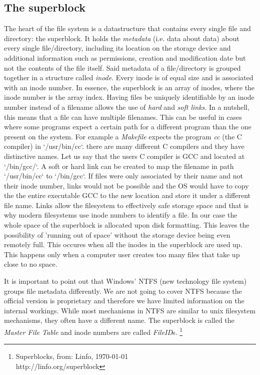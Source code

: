 \begin{enumerate}
\subsection{The superblock}

The heart of the file system is a datastructure that contains every single file and directory: the
superblock. It holds the \textit{metadata} (i.e. data about data) about every single file/directory,
including its location on the storage device and additional information such as permissions, creation
and modification date but not the contents of the file itself. Said metadata of a file/directory is
grouped together in a structure called \textit{inode}. Every inode is of equal size and is associated
with an inode number. In essence, the superblock is an array of inodes, where the inode number is the
array index. Having files be uniquely identifiable by an inode number instead of a filename allows 
the use of \textit{hard} and \textit{soft links}. In a nutshell, this means that a file can have multiple filenames.
This can be useful in cases where some programs expect a certain path for a different program than the
one present on the system. For example a \textit{Makefile} expects the program \textit{cc} (the C compiler) in
`/usr/bin/cc`. there are many different C compilers and they have distinctive names. Let us say that the
users C compiler is GCC and located at `/bin/gcc/`. A soft or hard link can be created to map the
filename in path `/usr/bin/cc` to `/bin/gcc`. If files were only associated by their name and not 
their inode number, links would not be possible and the OS would have to copy the the entire
executable GCC to the new location and store it under a different file name. Links allow the
filesystem to effectively safe storage space and that is why modern filesystems use inode numbers to
identify a file. In our case the whole space of the superblock is allocated upon disk formatting.
This leaves the possibility of 'running out of space' without the storage device being even remotely
full. This occures when all the inodes in the superblock are used up. This happens only when a
computer user creates too many files that take up close to no space.

It is important to point out that Windows' NTFS (new technology file system) groups file metadata differently. 
We are not going to cover NTFS because the official version is proprietary and therefore we have limited 
information on the internal workings. While most mechanisms in NTFS are similar to
unix filesystem mechanisms, they often have a different name. The superblock is called the \textit{Master
File Table} and inode numbers are called \textit{FileID}s. \footnote{Superblocks, from: Linfo, \today  \\ http://linfo.org/superblock}



\end{enumerate}
